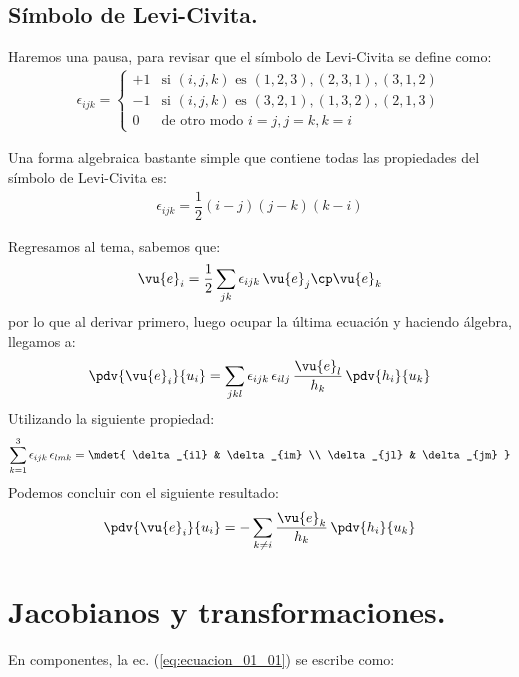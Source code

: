\subsection*{Símbolo de Levi-Civita.}

Haremos una pausa, para revisar que el símbolo de Levi-Civita se define como:
\begin{align*}
\epsilon_{ijk} = \begin{cases}
+1 & \mbox{si } (i, j, k) \mbox{ es } (1, 2, 3), (2, 3, 1), (3, 1, 2) \\[0.5em]
-1 & \mbox{si } (i, j, k) \mbox{ es } (3, 2, 1), (1, 3, 2), (2, 1, 3) \\[0.5em]
0 & \mbox{de otro modo } i = j, j = k, k = i 
\end{cases}
\end{align*}

Una forma algebraica bastante simple que contiene todas las propiedades del símbolo de Levi-Civita es:
\begin{align*}
\epsilon_{ijk} = \dfrac{1}{2} (i - j) (j - k) (k - i)
\end{align*}

Regresamos al tema, sabemos que:
\begin{align*}
\vu{e}_{i} = \dfrac{1}{2} \sum_{jk} \epsilon_{ijk} \, \vu{e}_{j} \cp \vu{e}_{k}
\end{align*}
por lo que al derivar primero, luego ocupar la última ecuación y haciendo álgebra, llegamos a:
\begin{align*}
\pdv{\vu{e}_{i}}{u_{i}} = \sum_{jkl} \epsilon_{ijk} \, \epsilon_{ilj} \, \dfrac{\vu{e}_{l}}{h_{k}} \, \pdv{h_{i}}{u_{k}}
\end{align*}
Utilizando la siguiente propiedad:
\begin{align*}
\sum_{k=1}^{3} \epsilon_{ijk} \, \epsilon_{lmk} = \mdet{
\delta_{il} & \delta_{im} \\
\delta_{jl} & \delta_{jm} }
\end{align*}
Podemos concluir con el siguiente resultado:
\begin{align*}
\pdv{\vu{e}_{i}}{u_{i}} = - \sum_{k \neq i} \dfrac{\vu{e}_{k}}{h_{k}} \, \pdv{h_{i}}{u_k}
\end{align*}

\section{Jacobianos y transformaciones.}

En componentes, la ec. (\ref{eq:ecuacion_01_01}) se escribe como:

